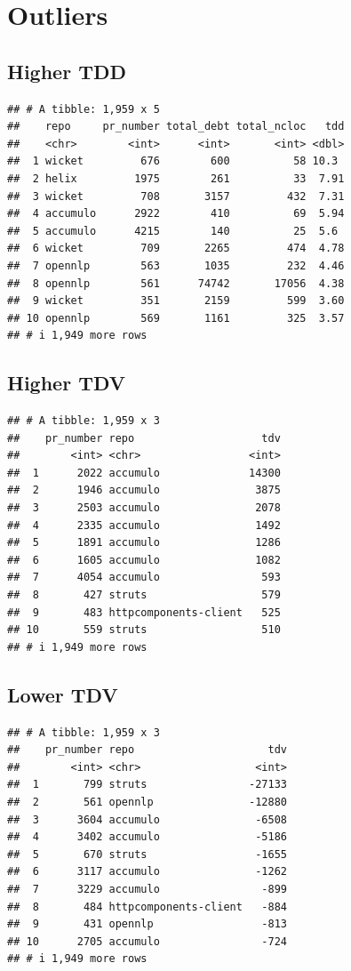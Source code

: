\documentclass[
]{article}
\begin{document}
\section{Outliers}\label{outliers}

\subsection{Higher TDD}\label{higher-tdd}

\begin{verbatim}
## # A tibble: 1,959 x 5
##    repo     pr_number total_debt total_ncloc   tdd
##    <chr>        <int>      <int>       <int> <dbl>
##  1 wicket         676        600          58 10.3 
##  2 helix         1975        261          33  7.91
##  3 wicket         708       3157         432  7.31
##  4 accumulo      2922        410          69  5.94
##  5 accumulo      4215        140          25  5.6 
##  6 wicket         709       2265         474  4.78
##  7 opennlp        563       1035         232  4.46
##  8 opennlp        561      74742       17056  4.38
##  9 wicket         351       2159         599  3.60
## 10 opennlp        569       1161         325  3.57
## # i 1,949 more rows
\end{verbatim}

\subsection{Higher TDV}\label{higher-tdv}

\begin{verbatim}
## # A tibble: 1,959 x 3
##    pr_number repo                    tdv
##        <int> <chr>                 <int>
##  1      2022 accumulo              14300
##  2      1946 accumulo               3875
##  3      2503 accumulo               2078
##  4      2335 accumulo               1492
##  5      1891 accumulo               1286
##  6      1605 accumulo               1082
##  7      4054 accumulo                593
##  8       427 struts                  579
##  9       483 httpcomponents-client   525
## 10       559 struts                  510
## # i 1,949 more rows
\end{verbatim}

\subsection{Lower TDV}\label{lower-tdv}

\begin{verbatim}
## # A tibble: 1,959 x 3
##    pr_number repo                     tdv
##        <int> <chr>                  <int>
##  1       799 struts                -27133
##  2       561 opennlp               -12880
##  3      3604 accumulo               -6508
##  4      3402 accumulo               -5186
##  5       670 struts                 -1655
##  6      3117 accumulo               -1262
##  7      3229 accumulo                -899
##  8       484 httpcomponents-client   -884
##  9       431 opennlp                 -813
## 10      2705 accumulo                -724
## # i 1,949 more rows
\end{verbatim}
\end{document}
